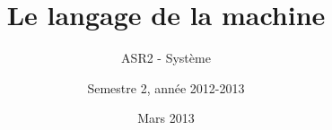 \documentclass[]{beamer}
\subtitle{ASR2 - Système}
\title{Le langage de la machine}
\author{Semestre 2, année 2012-2013}
\institute{
  Département informatique\\
  IUT Bordeaux 1
}
\date{Mars 2013}
\begin{document}
\newcommand{\bashlisting}[0]{\lstset{language=bash,numbers=left,numberstyle=\tiny,frame=single}}

\begin{frame}
  \titlepage
\end{frame}




\end{document}
